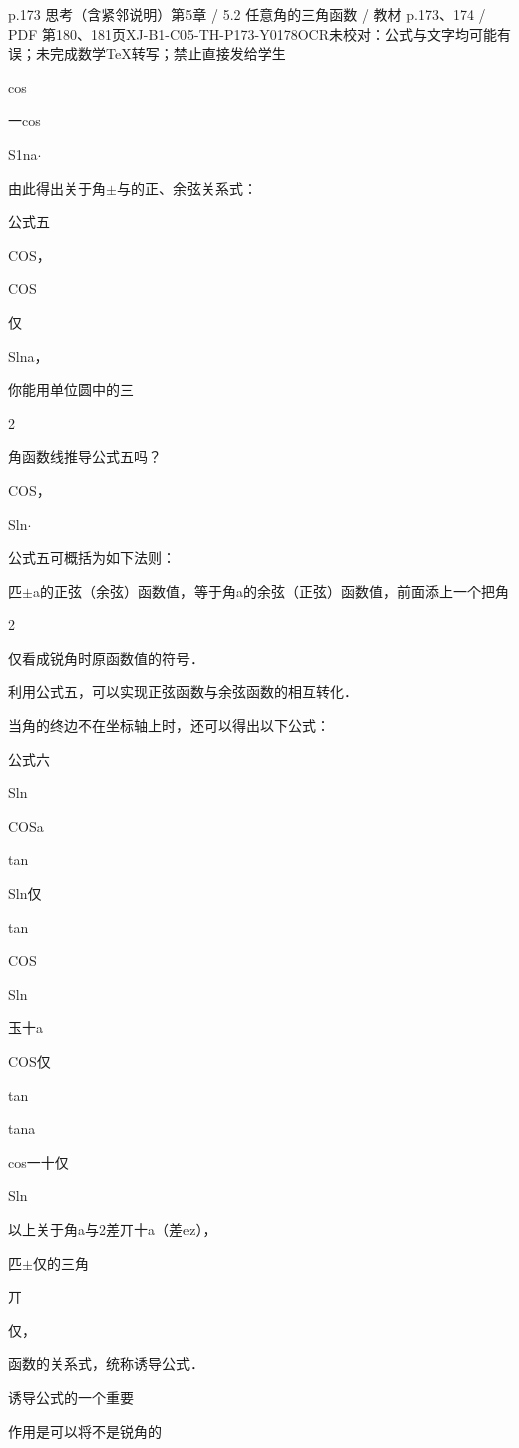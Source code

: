 \begin{bankitem}{p.173 思考（含紧邻说明）}{第5章 / 5.2 任意角的三角函数 / 教材 p.173、174 / PDF 第180、181页}{XJ-B1-C05-TH-P173-Y0178}{OCR未校对：公式与文字均可能有误；未完成数学TeX转写；禁止直接发给学生}
\begin{ocrdraft}
\par
cos
\par
一cos
\par
S1na\ensuremath{\cdot}
\par
由此得出关于角\ensuremath{\pm}与的正、余弦关系式：
\par
公式五
\par
COS，
\par
COS
\par
仅
\par
Slna，
\par
你能用单位圆中的三
\par
2
\par
角函数线推导公式五吗？
\par
COS，
\par
Sln\ensuremath{\cdot}
\par
公式五可概括为如下法则：
\par
匹\ensuremath{\pm}a的正弦（余弦）函数值，等于角a的余弦（正弦）函数值，前面添上一个把角
\par
2
\par
仅看成锐角时原函数值的符号．
\par
利用公式五，可以实现正弦函数与余弦函数的相互转化．
\par
[教材p.174 / PDF第181页]
\par
当角的终边不在坐标轴上时，还可以得出以下公式：
\par
公式六
\par
Sln
\par
COSa
\par
tan
\par
Sln仅
\par
tan
\par
COS
\par
Sln
\par
玉十a
\par
COS仅
\par
tan
\par
tana
\par
cos一十仅
\par
Sln
\par
以上关于角a与2差丌十a（差ez），
\par
匹\ensuremath{\pm}仅的三角
\par
丌
\par
仅，
\par
函数的关系式，统称诱导公式．
\par
诱导公式的一个重要
\par
作用是可以将不是锐角的
\end{ocrdraft}
\end{bankitem}
